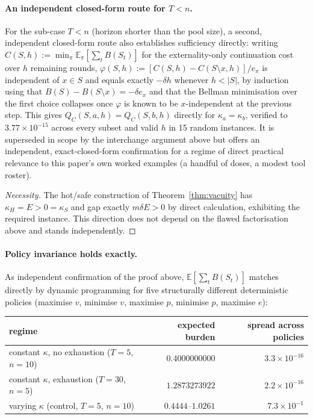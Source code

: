 \paragraph{An independent closed-form route for $T<n$.} For the sub-case $T<n$ (horizon shorter than the pool size), a second,
independent closed-form route also establishes sufficiency directly: writing
$C(S,h):=\min_\pi\mathbb{E}_\pi[\sum_t B(S_t)]$ for the externality-only
continuation cost over $h$ remaining rounds, $\varphi(S,h):=[C(S,h)-C(S{\setminus}x,h)]/e_x$
is independent of $x\in S$ and equals exactly $-\delta h$ whenever $h<|S|$,
by induction using that $B(S)-B(S{\setminus}x)=-\delta e_x$ and that the
Bellman minimisation over the first choice collapses once $\varphi$ is known
to be $x$-independent at the previous step. This gives $Q_C(S,a,h)=Q_C(S,b,h)$
directly for $\kappa_a=\kappa_b$, verified to $3.77\times10^{-15}$ across
every subset and valid $h$ in 15 random instances. It is superseded in scope
by the interchange argument above but offers an independent, exact-closed-form
confirmation for a regime of direct practical relevance to this paper's own
worked examples (a handful of doses, a modest tool roster).

\begin{proof}[Necessity]
The hot/safe construction of Theorem~\ref{thm:vacuity} has $\kappa_H = E > 0 =
\kappa_S$ and gap exactly $m\delta E > 0$ by direct calculation, exhibiting the
required instance. This direction does not depend on the flawed factorisation above
and stands independently.
\end{proof}

\paragraph{Policy invariance holds exactly.} As independent confirmation of the proof
above, $\mathbb{E}[\sum_t B(S_t)]$ matches directly by dynamic programming for
five structurally different deterministic policies (maximise $v$, minimise $v$,
maximise $p$, minimise $p$, maximise $e$):

\begin{center}
\begin{tabular}{lrr}
\toprule
regime & expected burden & spread across policies \\
\midrule
constant $\kappa$, no exhaustion ($T{=}5$, $n{=}10$) & $0.4000000000$ & $3.3 \times 10^{-16}$ \\
constant $\kappa$, exhaustion ($T{=}30$, $n{=}5$) & $1.2873273922$ & $2.2 \times 10^{-16}$ \\
varying $\kappa$ (control, $T{=}5$, $n{=}10$) & $0.4444$--$1.0261$ & $7.3 \times 10^{-1}$ \\
\bottomrule
\end{tabular}
\end{center}

